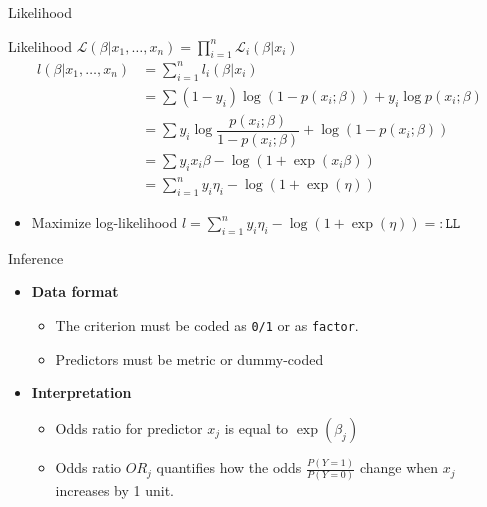 \documentclass[
  ignorenonframetext,
]{beamer}
\providecommand{\tightlist}{%
  \setlength{\itemsep}{0pt}\setlength{\parskip}{0pt}}
\begin{document}
\begin{frame}{Likelihood}
\protect\hypertarget{likelihood}{}

Likelihood
\(\mathcal{L}(\beta|x_1,\ldots,x_n)=\prod_{i=1}^n \mathcal{L}_i(\beta|x_i)\)
\[\begin{aligned}
  \mathit{l}(\beta|x_1,\ldots,x_n)& =\sum_{i=1}^n l_i(\beta|x_i)\\
  &=\sum (1-y_i)\log(1-p(x_i;\beta)) + y_i\log p(x_i;\beta)\\
  &=\sum y_i\log\dfrac{p(x_i;\beta)}{1-p(x_i;\beta)}+\log(1-p(x_i;\beta))\\
  &=\sum y_ix_i\beta - \log(1+\exp(x_i\beta))\\
  &=\sum_{i=1}^ny_i\eta_i-\log(1+\exp(\eta))
\end{aligned}\]

\begin{itemize}
\tightlist
\item
  Maximize log-likelihood
  \(l=\sum_{i=1}^ny_i\eta_i-\log(1+\exp(\eta))=:\mathtt{LL}\)
\end{itemize}

\end{frame}

\begin{frame}[fragile]{Inference}
\protect\hypertarget{inference}{}

\begin{itemize}
\tightlist
\item
  \textbf{Data format}

  \begin{itemize}
  \tightlist
  \item
    The criterion must be coded as \texttt{0/1} or as \texttt{factor}.
  \item
    Predictors must be metric or dummy-coded
  \end{itemize}
\item
  \textbf{Interpretation}

  \begin{itemize}
  \tightlist
  \item
    Odds ratio for predictor \(x_j\) is equal to \(\exp(\beta_j)\)
  \item
    Odds ratio \(OR_j\) quantifies how the odds
    \(\frac{P(Y=1)}{P(Y=0)}\) change when \(x_j\) increases by 1 unit.
  \end{itemize}
\end{itemize}

\end{frame}
\end{document}
